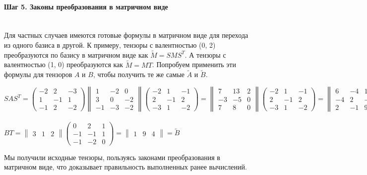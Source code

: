 \documentclass{article}
\begin{document}
\paragraph*{Шаг 5. Законы преобразования в матричном виде} \, \\
Для частных случаев имеются готовые формулы в матричном виде для перехода из одного базиса в другой. К примеру, тензоры с валентностью (0, 2) преобразуются по базису в матричном виде как $\tilde{M} = SMS^{T}$. А тензоры с валентностью (1, 0) преобразуются как $\tilde{M} = MT$. Попробуем применить эти формулы для тензоров $A$ и $B$, чтобы получить те же самые $\tilde{A}$ и $\tilde{B}$.
\begin{center}
$SAS^T = \begin{pmatrix}
-2 & 2 & -3 \\ 1 & -1 & 1 \\ -1 & 2 & -2
\end{pmatrix}\begin{Vmatrix}
1 & -2 & 0 \\ 3 & 0 & -2 \\ -1 & -3 & -2
\end{Vmatrix}\begin{pmatrix}
-2 & 1 & -1 \\ 2 & -1 & 2 \\ -3 & 1 & -2
\end{pmatrix} = \begin{Vmatrix}
7 & 13 & 2 \\ -3 & -5 & 0 \\ 7 & 8 & 0
\end{Vmatrix}\begin{pmatrix}
-2 & 1 & -1 \\ 2 & -1 & 2 \\ -3 & 1 & -2
\end{pmatrix} = \begin{Vmatrix}
6 & -4 & 15 \\ -4 & 2 & -7 \\ 2 & -1 & 9
\end{Vmatrix} = \tilde{A}$ \\ \, \\
$BT = \begin{Vmatrix}
3 & 1 & 2
\end{Vmatrix}\begin{pmatrix}
0 & 2 & 1 \\ -1 & -1 & 1 \\ -1 & -2 & 0
\end{pmatrix} = \begin{Vmatrix}
1 & 9 & 4
\end{Vmatrix} = \tilde{B}$
\end{center}
Мы получили исходные тензоры, пользуясь законами преобразования в матричном виде, что доказывает правильность выполненных ранее вычислений.
\end{document}
